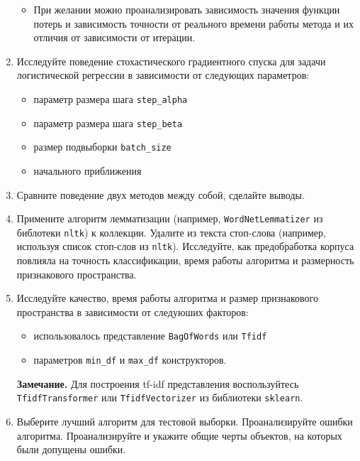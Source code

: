 \documentclass[10pt,fleqn]{article}
\begin{document}
\begin{enumerate}
\begin{itemize}
        \item При желании можно проанализировать зависимость значения функции потерь и зависимость точности от реального времени работы метода и их отличия от зависимости от итерации.
    \end{itemize}

    \item Исследуйте поведение стохастического градиентного спуска для задачи логистической регрессии в зависимости от следующих параметров:
    \begin{itemize}
        \item параметр размера шага \texttt{step\_alpha}
        \item параметр размера шага \texttt{step\_beta}
        \item размер подвыборки \texttt{batch\_size}
        \item начального приближения
    \end{itemize}


    \item Сравните поведение двух методов между собой, сделайте выводы.

    \item Примените алгоритм лемматизации (например,  \texttt{WordNetLemmatizer} из библотеки \texttt{nltk}) к коллекции. Удалите из текста стоп-слова (например, используя список стоп-слов из \texttt{nltk}). Исследуйте, как предобработка корпуса повлияла на точность классификации, время работы алгоритма и размерность признакового пространства.

    \item Исследуйте качество, время работы алгоритма и размер признакового пространства в зависимости от следуюших факторов:

    \begin{itemize}
        \item использовалось представление \verb|BagOfWords| или \verb|Tfidf|
        \item параметров \texttt{min\_df} и \texttt{max\_df} конструкторов.
    \end{itemize}

    \textbf{Замечание.} Для построения tf-idf представления воспользуйтесь \texttt{TfidfTransformer} или \texttt{TfidfVectorizer} из библиотеки \texttt{sklearn}.

    \item Выберите лучший алгоритм для тестовой выборки. Проанализируйте ошибки алгоритма. Проанализируйте и укажите общие черты объектов, на которых были допущены ошибки.

\end{enumerate}
\end{document}

